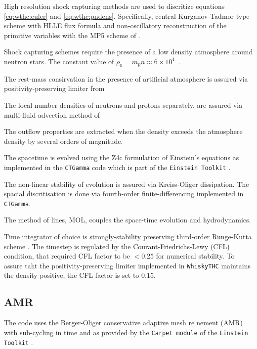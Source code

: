 High resolution shock capturing methods are used to discritize equations 
\eqref{eq:wthc:euler} and \eqref{eq:wthc:pndens}.
Specifically, central Kurganov-Tadmor type scheme \cite{Kurganov:2000} with 
HLLE flux formula \cite{Einfeldt:1988}
and non-oscillatory reconstruction of the primitive variables with the MP5 scheme of
\cite{Suresh:1997}.

Shock capturing schemes require the presence of a low density atmosphere around neutron stars.
The constant value of $\rho_0 = m_p n \approx 6\times 10^4$~\gcm.

The rest-mass consirvation in the presence of artificial atmosphere is assured via 
positivity-preserving limiter from \cite{Radice:2013xpa}

The local number densities of neutrons and protons separately, are assured via 
multi-fluid advection method of \cite{Plewa:1998nma}

The outflow properties are extracted when the density exceeds the atmosphere density
by several orders of magnitude.

The spacetime is evolved using the Z4c formulation of Einstein's equations
\cite{Bernuzzi:2009ex,Hilditch:2012fp} as implemented in the \texttt{CTGamma} code
\cite{Pollney:2009yz,Reisswig:2013sqa} which is part of the \texttt{Einstein Toolkit} 
\cite{Loffler:2011ay}.

The non-linear stability of evolution is assured via Kreiss-Oliger dissipation. 
The spacial discritisation is done via fourth-order finite-differencing implemented in \texttt{CTGamma}.

The method of lines, MOL, couples the space-time evolution and hydrodynamics. 

Time integrator of choice is strongly-stability preserving third-order Runge-Kutta scheme \cite{Gottlieb:2009}.
The timestep is regulated by the Courant-Friedrichs-Lewy (CFL) condition, that required CFL factor 
to be $<0.25$ for numerical stability. To assure taht the positivity-preserving limiter implemented in \texttt{WhiskyTHC} maintains the density positive, the CFL factor is set to $0.15$.


\subsection{AMR}


The code uses the Berger-Oliger conservative adaptive mesh renement (AMR) \cite{Berger:1984} with 
sub-cycling in time and  \cite{Berger:1989,Reisswig:2012nc} as provided by the \texttt{Carpet module} of the \texttt{Einstein Toolkit} 
\cite{Schnetter:2003rb}. 


